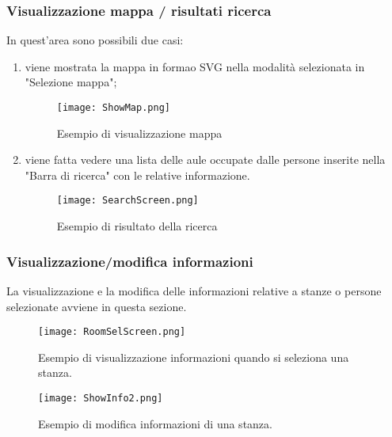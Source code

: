 \subsubsection*{Visualizzazione mappa / risultati ricerca}
In quest'area sono possibili due casi:
\begin{enumerate}
\item viene mostrata la mappa in formao SVG nella modalità selezionata in "Selezione mappa";

\begin{figure}[!htb]
\centering%
\texttt{[image: ShowMap.png]}
\caption{Esempio di visualizzazione mappa}\label{Screen:showmap}%
\end{figure}
\FloatBarrier

\item viene fatta vedere una lista delle aule occupate dalle persone inserite nella "Barra di ricerca" con le relative informazione.

\begin{figure}[!htb]
\centering%
\texttt{[image: SearchScreen.png]}%
\caption{Esempio di risultato della ricerca}\label{Screen:search}%
\end{figure}
\FloatBarrier

\end{enumerate}
\newpage
\subsubsection*{Visualizzazione/modifica informazioni}
La visualizzazione e la modifica delle informazioni relative a stanze o persone selezionate avviene in questa sezione.

\begin{figure}[!htb]
\centering%
\texttt{[image: RoomSelScreen.png]}
\caption{Esempio di visualizzazione informazioni quando si seleziona una stanza.}\label{Screen:info1}%
\end{figure}

\begin{figure}[!htb]
\centering%
\texttt{[image: ShowInfo2.png]}%
\caption{Esempio di modifica informazioni di una stanza.}\label{Screen:info2}%
\end{figure}
\FloatBarrier


